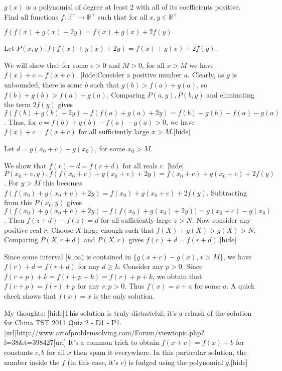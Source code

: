 \begin{solution}
	\begin{tcolorbox}$g(x)$ is a polynomial of degree at least $2$ with all of its coefficients positive. Find all functions $f:\mathbb R^+ \longrightarrow \mathbb R^+$ such that for all $x,y\in \mathbb R^+$

                                                                                  $f(f(x)+g(x)+2y)=f(x)+g(x)+2f(y)$\end{tcolorbox}

Let $P(x,y):f(f(x)+g(x)+2y)=f(x)+g(x)+2f(y)$.

We will show that for some $c>0$ and $M>0$, for all $x>M$ we have $f(x)+c=f(x+c)$.
[hide]Consider a positive number $a$. Clearly, as $g$ is unbounded, there is some $b$ such that $g(b)>f(a)+g(a)$, so $f(b)+g(b)>f(a)+g(a)$.
Comparing $P(a,y),P(b,y)$ and eliminating the term $2f(y)$ gives
$f(f(b)+g(b)+2y)-f(f(a)+g(a)+2y)=f(b)+g(b)-f(a)-g(a)$.
Thus, for $c=f(b)+g(b)-f(a)-g(a)>0$, we have $f(x)+c=f(x+c)$ for all sufficiently large $x>M$.[\/hide]

Let $d=g(x_0 +c)-g(x_0)$, for some $x_0 >M$.

We show that $f(r)+d=f(r+d)$ for all reals $r$.
[hide]$P(x_0+c,y):f(f(x_0+c)+g(x_0+c)+2y)=f(x_0+c)+g(x_0+c)+2f(y)$.
For $y>M$ this becomes $f(f(x_0)+g(x_0+c)+2y)=f(x_0)+g(x_0+c)+2f(y)$.
Subtracting from this $P(x_0,y)$ gives $f(f(x_0)+g(x_0+c)+2y)-f(f(x_0)+g(x_0)+2y))=g(x_0+c)-g(x_0)$.
Then $f(z+d)-f(z)=d$ for all sufficiently large $z>N$.
Now consider any positive real $r$. Choose $X$ large enough such that $f(X)+g(X)>g(X)>N$.
Comparing $P(X,r+d)$ and $P(X,r)$ gives $f(r)+d=f(r+d)$.[\/hide]

Since some interval $[k, \infty )$ is contained in $ \{ g(x+c)-g(x), x>M \}$, we have
$f(r)+d=f(r+d)$ for any $d \geq  k$.
Consider any $p>0$. Since $f(r+p)+k=f(r+p+k)=f(r)+p+k$, we obtain that $f(r+p)=f(r)+p$ for any $r,p>0$.
Thus $f(x)=x+a$ for some $a$. A quick check shows that $f(x)=x$ is the only solution.

My thoughts:
[hide]This solution is truly distasteful; it's a rehash of the solution for China TST 2011 Quiz 2 - D1 - P1.
[url]http://www.artofproblemsolving.com/Forum/viewtopic.php?f=38&t=398427[\/url]
It's a common trick to obtain $f(x+c)=f(x)+b$ for constants $c,b$ for all $x$ then spam it everywhere.
In this particular solution, the number inside the $f$ (in this case, it's $c$) is fudged using the polynomial $g$.[\/hide]
\end{solution}



